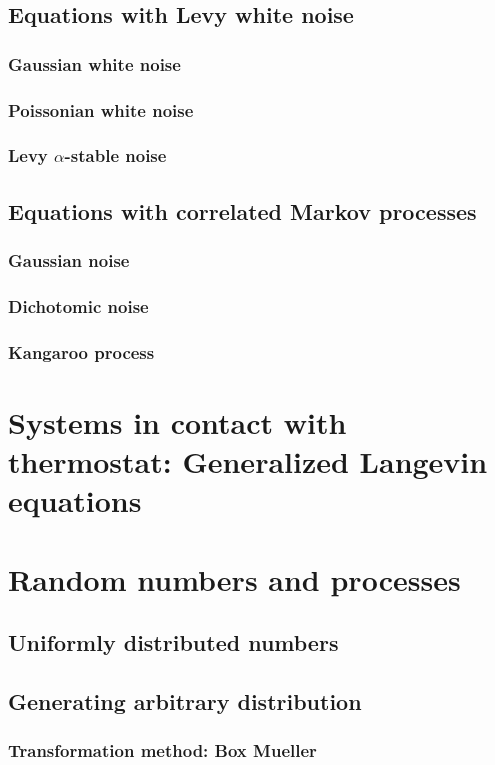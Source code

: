 \documentclass[authoryear,draft,1p,times]{elsarticle}
\renewcommand{\=}{\stackrel{\mathrm{d}}{=}}
\begin{document}
\subsection{Equations with Levy white noise}
\subsubsection{Gaussian white noise}
\subsubsection{Poissonian  white noise}
\subsubsection{Levy $\alpha$-stable noise}
\subsection{Equations with correlated Markov processes}
\subsubsection{Gaussian noise}
\subsubsection{Dichotomic noise}
\subsubsection{Kangaroo process} 

\section{Systems in contact with thermostat: Generalized Langevin equations}

\section{Random numbers and processes}

\subsection{Uniformly distributed numbers}
\subsection{Generating arbitrary distribution}
\subsubsection{Transformation method: Box Mueller}
\end{document}
